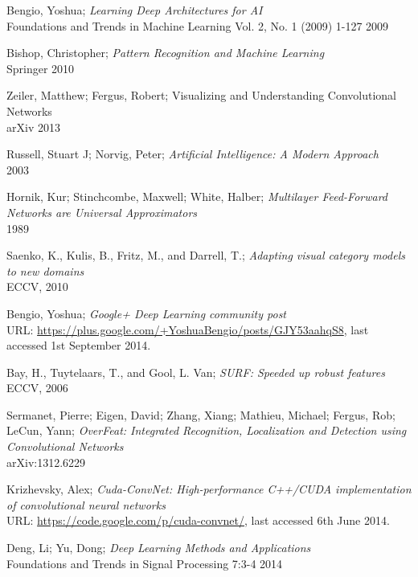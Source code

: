 \documentclass[a4paper,11pt]{article}
\begin{document}
\begin{thebibliography}{1}
 Bengio, Yoshua;
 \emph{Learning Deep Architectures for AI}\\
 Foundations and Trends in Machine Learning 
 Vol. 2, No. 1 (2009) 1-127
 2009

 Bishop, Christopher;
 \emph{Pattern Recognition and Machine Learning}\\
 Springer 2010

 Zeiler, Matthew; Fergus, Robert;
 Visualizing and Understanding Convolutional Networks\\
 arXiv 2013


 Russell, Stuart J; Norvig, Peter;
 \emph{Artificial Intelligence: A Modern Approach}\\
 2003

 Hornik, Kur; Stinchcombe, Maxwell; White, Halber;
 \emph{Multilayer Feed-Forward Networks are Universal Approximators}\\
 1989

 Saenko, K., Kulis, B., Fritz, M., and Darrell, T.;
 \emph{Adapting visual category models to new domains}\\
 ECCV, 2010

 Bengio, Yoshua;
 \emph{Google+ Deep Learning community post}\\
 URL: \url{https://plus.google.com/+YoshuaBengio/posts/GJY53aahqS8}, last accessed 1st September 2014.
 
 Bay, H., Tuytelaars, T., and Gool, L. Van;
 \emph{SURF: Speeded up robust features}\\
 ECCV, 2006

 Sermanet, Pierre; Eigen, David; Zhang, Xiang; Mathieu, Michael; Fergus, Rob; LeCun, Yann;
 \emph{OverFeat: Integrated Recognition, Localization and Detection using Convolutional Networks}\\
 arXiv:1312.6229
   
 Krizhevsky, Alex; 
 \emph{Cuda-ConvNet: High-performance C++/CUDA implementation of convolutional neural networks}\\
 URL: \url{https://code.google.com/p/cuda-convnet/}, last accessed 6th June 2014.
 
 Deng, Li; Yu, Dong;
 \emph{Deep Learning Methods and Applications}\\
 Foundations and Trends in Signal Processing
 7:3-4 2014


\end{thebibliography}
\end{document}
